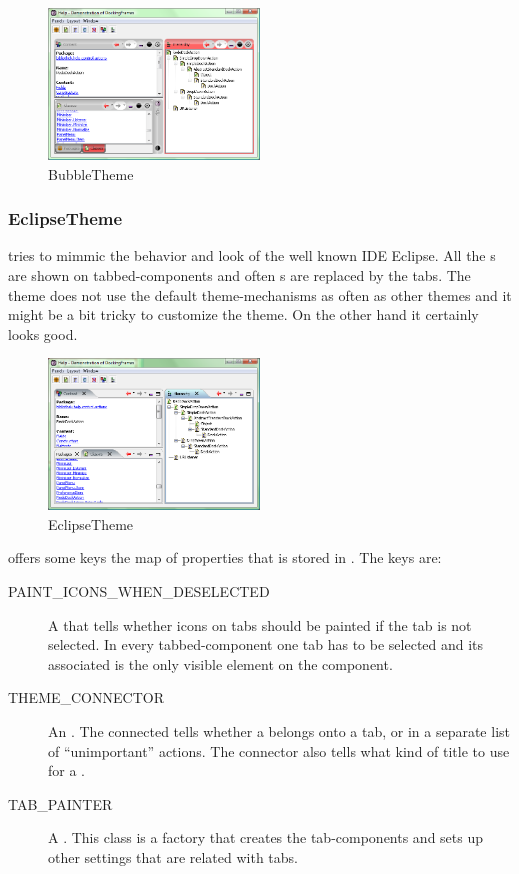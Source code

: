 \begin{figure}[ht]
\centering
\includegraphics[width=0.5\textwidth]{themes/theme_bubble}
\caption{BubbleTheme}
\label{fig:theme_bubble}
\end{figure}

\subsubsection{EclipseTheme}
 tries to mimmic the behavior and look of the well known IDE Eclipse. All the s are shown on tabbed-components and often \linebreak {}s are replaced by the tabs. The theme does not use the default theme-mechanisms as often as other themes and it might be a bit tricky to customize the theme. On the other hand it certainly looks good.

\begin{figure}[ht]
\centering
\includegraphics[width=0.5\textwidth]{themes/theme_eclipse}
\caption{EclipseTheme}
\label{fig:theme_eclipse}
\end{figure}

 offers some keys the map of properties that is stored in . The keys are:
\begin{description}
	\item[PAINT\_ICONS\_WHEN\_DESELECTED] A  that tells whether \linebreak icons on tabs should be painted if the tab is not selected. In every tabbed-component one tab has to be selected and its associated  is the only visible element on the component.
	\item[THEME\_CONNECTOR] An . The connected tells whether a  belongs onto a tab, or in a separate list of ``unimportant'' actions. The connector also tells what kind of title to use for a .
	\item[TAB\_PAINTER] A . This class is a factory that creates the tab-components and sets up other settings that are related with tabs.
\end{description}

